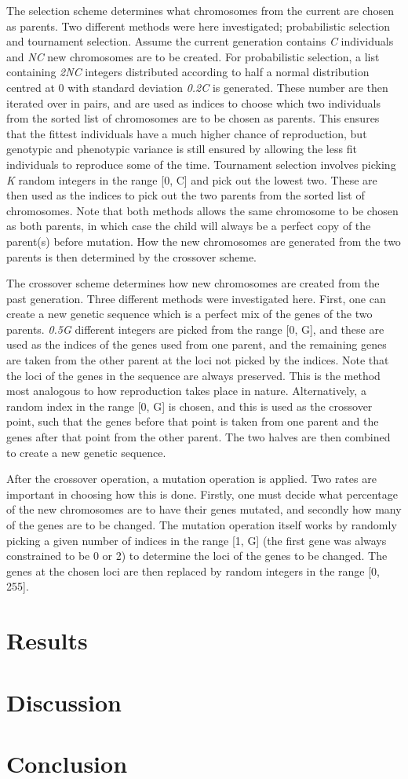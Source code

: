 \documentclass[multicolumn, 12pt]{extarticle}
\begin{document}
The selection scheme determines what chromosomes from the current are chosen as parents. Two different methods were here investigated; probabilistic selection and tournament selection. Assume the current generation contains \textit{C} individuals and \textit{NC} new chromosomes are to be created. For probabilistic selection, a list containing \textit{2NC} integers distributed according to half a normal distribution centred at 0 with standard deviation \textit{0.2C} is generated. These number are then iterated over in pairs, and are used as indices to choose which two individuals from the sorted list of chromosomes are to be chosen as parents. This ensures that the fittest individuals have a much higher chance of reproduction, but genotypic and phenotypic variance is still ensured by allowing the less fit individuals to reproduce some of the time. Tournament selection involves picking \textit{K} random integers in the range [0, C] and pick out the lowest two. These are then used as the indices to pick out the two parents from the sorted list of chromosomes. Note that both methods allows the same chromosome to be chosen as both parents, in which case the child will always be a perfect copy of the parent(s) before mutation. How the new chromosomes are generated from the two parents is then determined by the crossover scheme.

The crossover scheme determines how new chromosomes are created from the past generation. Three different methods were investigated here. First, one can create a new genetic sequence which is a perfect mix of the genes of the two parents. \textit{0.5G} different integers are picked from the range [0, G], and these are used as the indices of the genes used from one parent, and the remaining genes are taken from the other parent at the loci not picked by the indices. Note that the loci of the genes in the sequence are always preserved. This is the method most analogous to how reproduction takes place in nature. Alternatively, a random index in the range [0, G] is chosen, and this is used as the crossover point, such that the genes before that point is taken from one parent and the genes after that point from the other parent. The two halves are then combined to create a new genetic sequence. 

After the crossover operation, a mutation operation is applied. Two rates are important in choosing how this is done. Firstly, one must decide what percentage of the new chromosomes are to have their genes mutated, and secondly how many of the genes are to be changed. The mutation operation itself works by randomly picking a given number of indices in the range [1, G] (the first gene was always constrained to be 0 or 2) to determine the loci of the genes to be changed. The genes at the chosen loci are then replaced by random integers in the range [0, 255].

\section{Results}

\section{Discussion}

\section{Conclusion}



\end{document}

